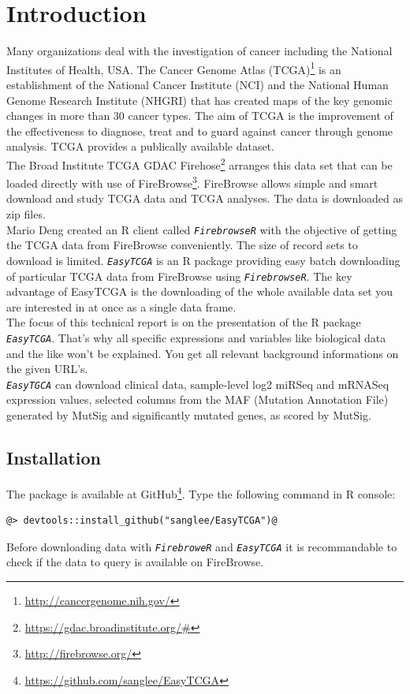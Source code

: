\documentclass[a4paper,12pt,listof=totoc,bibliography=totoc]{scrartcl}
\begin{document}
\section{Introduction}
Many organizations deal with the investigation of cancer including the National Institutes of Health, USA.
The Cancer Genome Atlas (TCGA)\footnote{\url{http://cancergenome.nih.gov/}} is an establishment of the
National Cancer Institute (NCI) and the National Human Genome Research Institute (NHGRI)
that has created maps of the key genomic changes in more than 30 cancer types. The aim of TCGA is the improvement
of the effectiveness to diagnose, treat and to guard against cancer through genome analysis. TCGA provides a
publically available dataset.\\
The Broad Institute TCGA GDAC Firehose\footnote{\url{https://gdac.broadinstitute.org/#}} arranges this
data set that can be loaded directly with use of FireBrowse\footnote{\url{http://firebrowse.org/}}. FireBrowse allows
simple and smart download and study TCGA data and TCGA analyses. The data is downloaded as zip files.\\
Mario Deng created an R client called \texttt{\em FirebrowseR} with the objective of getting the TCGA data from FireBrowse conveniently.
The size of record sets to download is limited. \texttt{\em EasyTCGA} is an R package providing easy batch downloading of particular
TCGA data from FireBrowse using \texttt{\em FirebrowseR}. The key advantage of EasyTCGA is the downloading of the whole available
data set you are interested in at once as a single data frame. \\
The focus of this technical report is on the presentation of the R package \texttt{\em EasyTCGA}. That's why all specific expressions and variables 
like biological data and the like won't be explained. You get all relevant background informations on the given URL's.\\
\texttt{\em EasyTGCA} can download clinical data, sample-level log2 miRSeq and mRNASeq expression values, selected columns
from the MAF (Mutation Annotation File) generated by MutSig and significantly mutated genes, as scored by MutSig.\\

\subsection{Installation}
The package is available at GitHub\footnote{\url{https://github.com/sanglee/EasyTCGA}}. Type the following command in R console:
\begin{lstlisting}[style=base]
@> devtools::install_github("sanglee/EasyTCGA")@
\end{lstlisting}
Before downloading data with \texttt{\em FirebroweR} and \texttt{\em EasyTCGA} it is recommandable to check if the data to query is available 
on FireBrowse.\\
\end{document}
